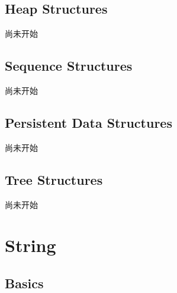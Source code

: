 \documentclass[10pt]{ctexart}
\begin{document}
{\subsection{Heap Structures}
尚未开始
\subsection{Sequence Structures}
尚未开始
\subsection{Persistent Data Structures}
尚未开始
\subsection{Tree Structures}
尚未开始


\newpage
\section{String}
\subsection{Basics}

}
\end{document}
